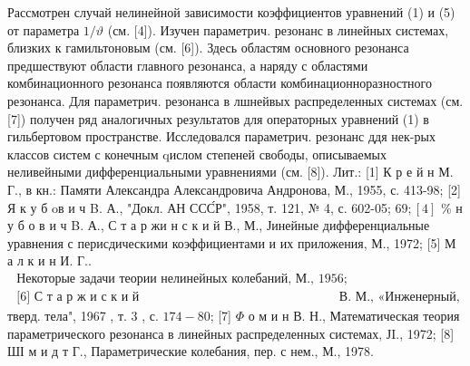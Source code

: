 \documentclass[10pt]{article}
\begin{document}
Рассмотрен случай нелинейной зависимости коэффициентов уравнений (1) и (5) от параметра $1 / \vartheta$ (см. [4]). Изучен параметрич. резонанс в линейных системах, близких к гамильтоновым (см. [6]). Здесь областям основного резонанса предшествуют области главного резонанса, а наряду с областями комбинационного резонанса появляются области комбинационноразностного резонанса. Для параметрич. резонанса в лшнейвых распределенных системах (см. [7]) получен ряд аналогичных результатов для операторных уравнений (1) в гильбертовом пространстве. Исследовался параметрич. резонанс ддя нек-рых классов систем с конечным qислом степеней свободы, описываемых неливейными дифференциальными уравнениями (см. [8]). Лит.: [1] К р е й н М. Г., в кн.: Памяти Александра Александровича Андронова, М., 1955, с. 413-98; [2] Я к у б oв и ч B. А., "Докл. АН ССС́Р", 1958, т. 121, № 4, с. 602-05; $69 ;[4]$ \% н у б о в и ч B. А., С т а р жи н с к и й В., М., Јинейные дифференциальные уравнения с перисдическими коэффициентами и их приложения, М., 1972; [5] М а л к и н И. Г.. $\begin{array}{ll}\text { Некоторые задачи теории нелинейных колебаний, М., } 1956 \text {; } \\ \text { [6] С т а р ж и с к и й } & \text { В. М., «Инженерный, }\end{array}$ тверд. тела", 1967 , т. 3 , с. $174-80$; [7] $\Phi$ о м и н В. Н., Математическая теория параметрического резонанса в линейных распределенных системах, ЈI., 1972; [8] ШІ м и д т Г., Параметрические колебания, пер. с нем., М., 1978.
\end{document}
